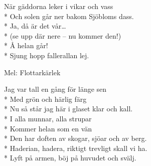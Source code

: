\begin{SongText}
    \begin{SongVerse}
        När gäddorna leker i vikar och vass\\*%
        Och solen går ner bakom Sjöbloms dass.\\*%
        Ja, då är det vår…\\*%
        (se upp där nere – nu kommer den!)\\*%
        Å helan går!\\*%
        Sjung hopp fallerallan lej.
    \end{SongVerse}
\end{SongText}
\begin{SongText}
    \begin{SongInfo}
        Mel: Flottarkärlek
    \end{SongInfo}
    \begin{SongVerse}
        Jag var tall en gång för länge sen\\*%
        Med grön och härlig färg\\*%
        Nu så står jag här i glaset klar och kall.\\*%
        I alla munnar, alla strupar\\*%
        Kommer helan som en vän\\*%
        Den har doften av skogar, sjöar och av berg.\\*%
        Haderian, hadera, riktigt trevligt skall vi ha.\\*%
        Lyft på armen, böj på huvudet och svälj.
    \end{SongVerse}
\end{SongText}
